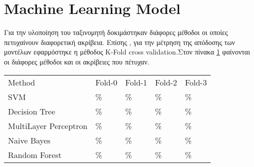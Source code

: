 \section{Machine Learning Model}

Για την υλοποίηση του ταξινομητή δοκιμάστηκαν διάφορες μέθοδοι οι οποίες πετυχαίνουν διαφορετική ακρίβεια. Επίσης , για την μέτρηση της απόδοσης των μοντέλων εφαρμόστηκε η μέθοδος K-Fold cross validation.Στον πίνακα \ref{table:1} φαίνονται οι διάφορες μέθοδοι και οι ακρίβειες που πέτυχαν.


\begin{table}[h]
\begin{tabular}{lllll}
Method                & Fold-0 & Fold-1 & Fold-2 & Fold-3 \\
SVM                   & \%     & \%     & \%     & \%     \\
Decision Tree         & \%     & \%     & \%     & \%     \\
MultiLayer Perceptron & \%     & \%     & \%     & \%     \\
Naive Bayes           & \%     & \%     & \%     & \%     \\
Random Forest         & \%     & \%     & \%     & \%    
\end{tabular}
\label{table:1}
\end{table}